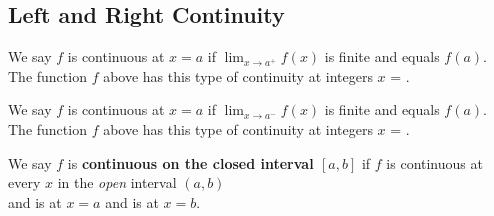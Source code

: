 \documentclass[10pt, addpoints]{exam}
\begin{document}
\begin{questions}
\vspace{-1mm}
\section{Left and Right Continuity}
\vspace{-4mm}
\question We say $f$ is \fillin[left][1in] 
	continuous at $x=a$
	if $\lim_{x\to a^+}f(x)$ is finite 
	and equals $f(a)$.
	\\[2ex]
	The function $f$ above
	has this type of continuity at integers
	$x$ = \fillin[][2in].

\question We say $f$ is \fillin[right][1in] 
	continuous at $x=a$
	if $\lim_{x\to a^-}f(x)$ is finite 
	and equals $f(a)$.
	\\[2ex]
	The function $f$ above
	has this type of continuity at integers
	$x$ = \fillin[][2in].

\question We say $f$ is \textbf{continuous on the closed interval \boldmath $[a,b]$}
	if $f$ is continuous at every $x$ in the \emph{open} interval $(a,b)$
	\\[2ex]
	and is  at $x=a$
	and is  at $x=b$.

\end{questions}
\end{document}
